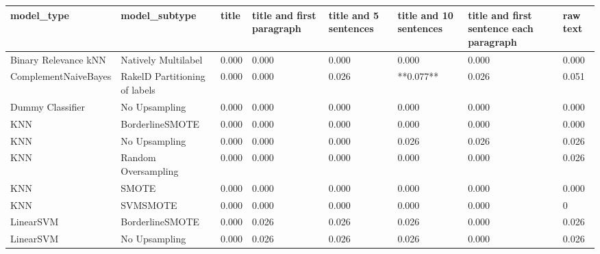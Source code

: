 \begin{tabular}{llllllll}
\toprule
                     model\_type &                 model\_subtype & title & title and first paragraph & title and 5 sentences & title and 10 sentences & title and first sentence each paragraph & raw text \\
\midrule
           Binary Relevance kNN &           Natively Multilabel & 0.000 &                     0.000 &                 0.000 &                  0.000 &                                   0.000 &    0.000 \\
           ComplementNaiveBayes & RakelD Partitioning of labels & 0.000 &                     0.000 &                 0.026 &              **0.077** &                                   0.026 &    0.051 \\
               Dummy Classifier &                 No Upsampling & 0.000 &                     0.000 &                 0.000 &                  0.000 &                                   0.000 &    0.000 \\
                            KNN &               BorderlineSMOTE & 0.000 &                     0.000 &                 0.000 &                  0.000 &                                   0.000 &    0.000 \\
                            KNN &                 No Upsampling & 0.000 &                     0.000 &                 0.000 &                  0.026 &                                   0.026 &    0.026 \\
                            KNN &           Random Oversampling & 0.000 &                     0.000 &                 0.000 &                  0.000 &                                   0.000 &    0.026 \\
                            KNN &                         SMOTE & 0.000 &                     0.000 &                 0.000 &                  0.000 &                                   0.000 &    0.000 \\
                            KNN &                      SVMSMOTE & 0.000 &                     0.000 &                 0.000 &                  0.000 &                                   0.000 &        0 \\
                      LinearSVM &               BorderlineSMOTE & 0.000 &                     0.026 &                 0.026 &                  0.026 &                                   0.000 &    0.026 \\
                      LinearSVM &                 No Upsampling & 0.000 &                     0.026 &                 0.026 &                  0.026 &                                   0.000 &    0.026 \\

\end{tabular}
